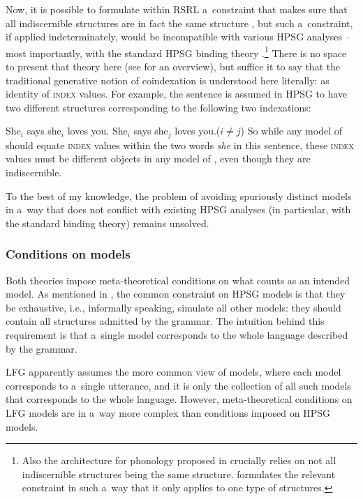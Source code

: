 \documentclass[output=paper,hidelinks]{langscibook}
\begin{document}
Now, it is possible to formulate within RSRL a~constraint that makes sure that all indiscernible structures are in fact the same structure \citep[Section {3.1.4}]{sail:03a}, but such a~constraint, if applied indeterminately, would be incompatible with various HPSG analyses -- most importantly, with the standard HPSG binding theory \citep[Chapter {6}]{pollard1994head-driven}.\footnote{Also the architecture for phonology proposed in \citet{hoeh:98} crucially relies on not all indiscernible structures being the same structure.  \citet{sail:03a} formulates the relevant constraint in such a~way that it only applies to one type of structures.}  There is no space to present that theory here (see \citealt{mul:bra:20} for an overview), but suffice it to say that the traditional generative notion of coindexation is understood here literally: as identity of \textsc{index} values.  For example, the sentence  is assumed in HPSG to have two different structures corresponding to the following two indexations:


\ea \ea \label{ex:sheshe:a}
She$_i$ says she$_i$ loves you.
\ex\label{ex:sheshe:b}
She$_i$ says she$_j$ loves you.\quad ($i \neq j$)
\z\z
So while any model of  should equate \textsc{index} values within the two words \emph{she} in this sentence, these \textsc{index} values must be different objects in any model of , even though they are indiscernible.

To the best of my knowledge, the problem of avoiding spuriously distinct models in a~way that does not conflict with existing HPSG analyses (in particular, with the standard binding theory) remains unsolved.


\subsubsection{Conditions on models}
\label{sec:mod:cnd}

Both theories impose meta-theoretical conditions on what counts as an intended model.  As mentioned in , the common constraint on HPSG models is that they be exhaustive, i.e., informally speaking, simulate all other models: they should contain all structures admitted by the grammar.  The intuition behind this requirement is that a~single model corresponds to the whole language described by the grammar.

LFG apparently assumes the more common view of models, where each model corresponds to a~single utterance, and it is only the collection of all such models that corresponds to the whole language.  However, meta-theoretical conditions on LFG models are in a~way more complex than conditions imposed on HPSG models.
\end{document}
